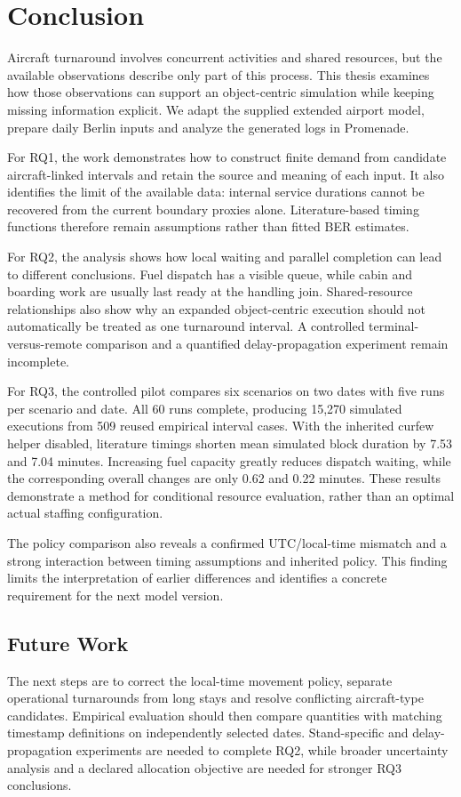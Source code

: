 \chapter{Conclusion}
\label{ch:conclusion}

Aircraft turnaround involves concurrent activities and shared resources, but the available observations describe only part of this process. This thesis examines how those observations can support an object-centric simulation while keeping missing information explicit. We adapt the supplied extended airport model, prepare daily Berlin inputs and analyze the generated logs in Promenade.

For RQ1, the work demonstrates how to construct finite demand from candidate aircraft-linked intervals and retain the source and meaning of each input. It also identifies the limit of the available data: internal service durations cannot be recovered from the current boundary proxies alone. Literature-based timing functions therefore remain assumptions rather than fitted BER estimates.

For RQ2, the analysis shows how local waiting and parallel completion can lead to different conclusions. Fuel dispatch has a visible queue, while cabin and boarding work are usually last ready at the handling join. Shared-resource relationships also show why an expanded object-centric execution should not automatically be treated as one turnaround interval. A controlled terminal-versus-remote comparison and a quantified delay-propagation experiment remain incomplete.

For RQ3, the controlled pilot compares six scenarios on two dates with five runs per scenario and date. All 60 runs complete, producing 15,270 simulated executions from 509 reused empirical interval cases. With the inherited curfew helper disabled, literature timings shorten mean simulated block duration by 7.53 and 7.04 minutes. Increasing fuel capacity greatly reduces dispatch waiting, while the corresponding overall changes are only 0.62 and 0.22 minutes. These results demonstrate a method for conditional resource evaluation, rather than an optimal actual staffing configuration.

The policy comparison also reveals a confirmed UTC/local-time mismatch and a strong interaction between timing assumptions and inherited policy. This finding limits the interpretation of earlier differences and identifies a concrete requirement for the next model version.

\section{Future Work}
The next steps are to correct the local-time movement policy, separate operational turnarounds from long stays and resolve conflicting aircraft-type candidates. Empirical evaluation should then compare quantities with matching timestamp definitions on independently selected dates. Stand-specific and delay-propagation experiments are needed to complete RQ2, while broader uncertainty analysis and a declared allocation objective are needed for stronger RQ3 conclusions.

